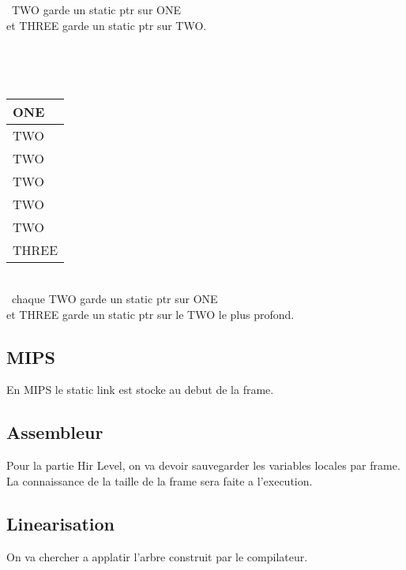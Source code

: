 \documentclass[a4paper,11pt]{article}
\begin{document}
\
TWO garde un static ptr sur ONE\\et THREE garde un static ptr sur TWO.

\

\
\begin{tabular}{|l|}
\hline
ONE   \\ \hline
TWO   \\ \hline
TWO   \\ \hline
TWO   \\ \hline
TWO   \\ \hline
TWO   \\ \hline
THREE \\ \hline
\end{tabular}
\\

\
chaque TWO garde un static ptr sur ONE\\et THREE garde un static ptr sur le TWO le plus profond.

\subsection{MIPS}
En MIPS le static link est stocke au debut de la frame.
\subsection{Assembleur}
Pour la partie Hir Level, on va devoir sauvegarder les variables locales par frame. \\
La connaissance de la taille de la frame sera faite a l'execution.\\


\subsection{Linearisation}

On va chercher a applatir l'arbre construit par le compilateur.\\

\newpage
\end{document}
